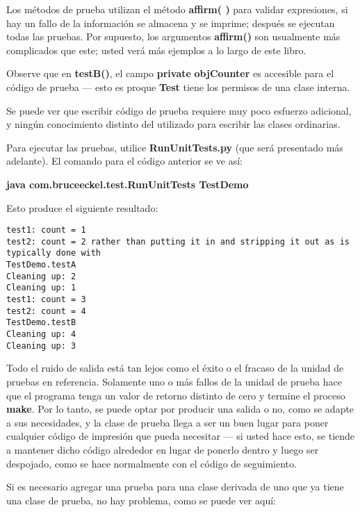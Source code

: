 Los métodos de prueba utilizan el método \textbf{affirm( )} para validar expresiones, si hay un fallo de la información se almacena y se imprime; después se ejecutan todas las pruebas. Por supuesto, los argumentos \textbf{affirm()} son usualmente más complicados que este; usted verá más ejemplos a lo largo de este libro.    \newline

Observe que en \textbf{testB()}, el campo \textbf{private } \textbf{objCounter} es accesible para el código de prueba — esto es proque \textbf{Test} tiene los permisos de una clase interna.  \newline

Se puede ver que escribir código de prueba requiere muy poco esfuerzo adicional, y ningún conocimiento distinto del utilizado para escribir las clases ordinarias.  \newline

Para ejecutar las pruebas, utilice \textbf{RunUnitTests.py} (que será presentado más adelante). El comando para el código anterior se ve así:   \newline

\textbf{java com.bruceeckel.test.RunUnitTests TestDemo} \newline

Esto produce el siguiente resultado: \newline

\begin{lstlisting}
test1: count = 1 
test2: count = 2 rather than putting it in and stripping it out as is typically done with 
TestDemo.testA 
Cleaning up: 2 
Cleaning up: 1 
test1: count = 3 
test2: count = 4 
TestDemo.testB 
Cleaning up: 4 
Cleaning up: 3 
\end{lstlisting}

Todo el ruido de salida está tan lejos como el éxito o el fracaso de la unidad de pruebas en referencia. Solamente uno o más fallos de la unidad de prueba hace que el programa tenga un valor de retorno distinto de cero y termine el proceso \textbf{make}. Por lo tanto, se puede optar por producir una salida o no, como se adapte a sus necesidades, y la clase de prueba llega a ser un buen lugar para poner cualquier código de impresión que pueda necesitar — si usted hace esto, se tiende a mantener dicho código alrededor en lugar de ponerlo dentro y luego ser despojado, como se hace normalmente con el código de seguimiento.   \newline

Si es necesario agregar una prueba para una clase derivada de uno que ya tiene una clase de prueba, no hay problema, como se puede ver aquí:     \newline

